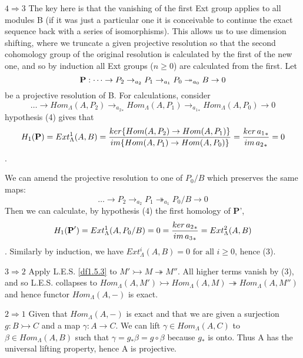  \textbf{$4\Longrightarrow 3$} The key here is that the vanishing
 of the first Ext group applies to all modules B (if it was just a
 particular one it is conceivable to continue the exact sequence
 back with a series of isomorphisms). This allows us to use
 dimension shifting, where we truncate a given projective
 resolution so that the second cohomology group of the original
 resolution is calculated by the first of the new one, and so by
 induction all Ext groups ($n\geq 0$) are calculated from the
 first.
 Let $$\textbf P: \dots \rightarrow P_2 \rightarrow _{a_2} P_1
 \rightarrow_{a_1} P_0 \twoheadrightarrow_{a_0}B \rightarrow 0$$
 be a projective resolution of B. For calculations, consider
$$\dots \rightarrow  Hom_\Lambda(A,P_2) \rightarrow _{{a_2}_*}
Hom_\Lambda(A,P_1) \rightarrow_{{a_1}_*} Hom_\Lambda(A,P_0)
\rightarrow 0$$ hypothesis (4) gives that
$$H_1(\textbf P)= Ext_\Lambda^1(A,B) = \frac{ker \{ Hom(A,P_2)\rightarrow
Hom(A,P_1)\}}{im \{ Hom(A,P_1)\rightarrow Hom(A,P_0)\}} =
\frac{ker\,{a_1}_*}{im\,{a_2}_*}=0$$.

We can amend the projective resolution to one of $P_0/B$ which
preserves the same maps:
$$\dots \rightarrow P_2 \rightarrow _{a_2} P_1
 \twoheadrightarrow_{a_1} P_0/B \rightarrow 0$$
 Then we can calculate, by hypothesis (4) the first homology of \textbf P',
$$H_1(\textbf P')=Ext_\Lambda^1(A,P_0/B) =0 = \frac{ker\,{a_2}_*}{im\,{a_3}_*}
= Ext_\Lambda^2(A,B)$$. Similarly by induction, we have
$Ext^i_\Lambda (A,B)=0\text{ for all } i\geq 0$, hence (3).

\textbf{$3\Longrightarrow 2$} Apply L.E.S. \ref{df1.5.3} to
$M'\rightarrowtail M \twoheadrightarrow M''$. All higher terms
vanish by (3), and so L.E.S. collapses to $Hom_\Lambda
(A,M')\rightarrowtail Hom_\Lambda (A,M)\twoheadrightarrow
Hom_\Lambda (A,M'')$ and hence functor $Hom_\Lambda (A,-)$ is
exact.

\textbf{$2\Longrightarrow 1$} Given that $Hom_\Lambda (A,-)$ is
exact and that we are given a surjection $g:B\rightarrowtail C$
and a map $\gamma :A\rightarrow C$. We can lift $\gamma\in
Hom_\Lambda (A,C)$ to $\beta \in Hom_\Lambda (A,B)$ such that
$\gamma = g_* \beta = g \circ \beta$ because $g_*$ is onto. Thus A
has the universal lifting property, hence A is projective.





